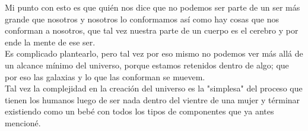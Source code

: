 \documentclass{article}
\begin{document}
Mi punto con esto es que quién nos dice que no podemos ser parte de un ser más grande que nosotros y nosotros lo conformamos así como hay cosas que nos conforman a nosotros, que tal vez nuestra parte de un cuerpo es el cerebro y por ende la mente de ese ser.\\
Es complicado plantearlo, pero tal vez por eso mismo no podemos ver más allá de un alcance mínimo del universo, porque estamos retenidos dentro de algo; que por eso las galaxias y lo que las conforman se muevem.\\
Tal vez la complejidad en la creación del universo es la "simplesa" del proceso que tienen los humanos luego de ser nada dentro del vientre de una mujer y términar existiendo como un bebé con todos los tipos de componentes que ya antes mencioné.

\maketitle
\end{document}
